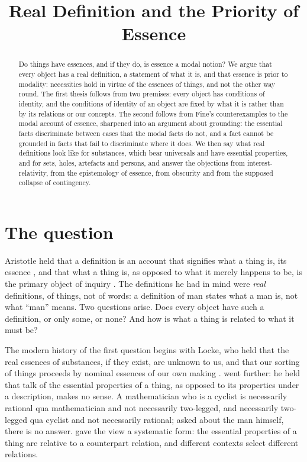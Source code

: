 \documentclass{situationist-preprint}
\title{Real Definition and the Priority of Essence}
\begin{document}
\maketitle

\begin{abstract}
Do things have essences, and if they do, is essence a modal notion? We argue that every object has a real definition, a statement of what it is, and that essence is prior to modality: necessities hold in virtue of the essences of things, and not the other way round. The first thesis follows from two premises: every object has conditions of identity, and the conditions of identity of an object are fixed by what it is rather than by its relations or our concepts. The second follows from Fine's counterexamples to the modal account of essence, sharpened into an argument about grounding: the essential facts discriminate between cases that the modal facts do not, and a fact cannot be grounded in facts that fail to discriminate where it does. We then say what real definitions look like for substances, which bear universals and have essential properties, and for sets, holes, artefacts and persons, and answer the objections from interest-relativity, from the epistemology of essence, from obscurity and from the supposed collapse of contingency.
\end{abstract}

\section{The question}\label{s:question}

Aristotle held that a definition is an account that signifies what a thing is, its essence \citep[I.5]{AristotleTop}, and that what a thing is, as opposed to what it merely happens to be, is the primary object of inquiry \citep[Z.4]{AristotleMet}. The definitions he had in mind were \emph{real} definitions, of things, not of words: a definition of man states what a man is, not what \enquote{man} means. Two questions arise. Does every object have such a definition, or only some, or none? And how is what a thing is related to what it must be?

The modern history of the first question begins with Locke, who held that the real essences of substances, if they exist, are unknown to us, and that our sorting of things proceeds by nominal essences of our own making \citep[III.iii.15]{LockeEssay}. \citet[§41]{Quine1960} went further: he held that talk of the essential properties of a thing, as opposed to its properties under a description, makes no sense. A mathematician who is a cyclist is necessarily rational qua mathematician and not necessarily two-legged, and necessarily two-legged qua cyclist and not necessarily rational; asked about the man himself, there is no answer. \citet{Lewis1986} gave the view a systematic form: the essential properties of a thing are relative to a counterpart relation, and different contexts select different relations.
\end{document}
